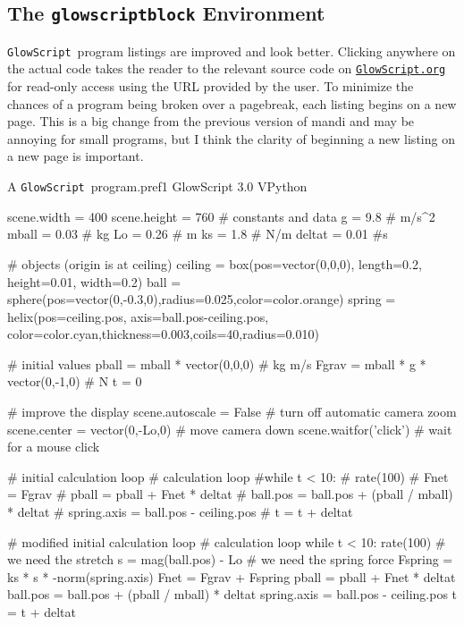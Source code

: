 \documentclass{article}
\newcommand*{\pkg}[1]{\textsf{#1}}                    %
\newcommand*{\GlowScript}{\texttt{GlowScript}}        %
\newcommand*{\GlowScriptorg}{\texttt{GlowScript.org}} %
\begin{document}
\subsection{The \texttt{glowscriptblock} Environment}
\GlowScript\ program listings are improved and look better. Clicking anywhere on the actual 
code takes the reader to the relevant source code on \href{https://www.glowscript.org}{\GlowScriptorg}
for read-only access using the URL provided by the user. To minimize the chances of a program being 
broken over a pagebreak, each listing begins on a new page. This is a big change from the previous 
version of \pkg{mandi} and may be annoying for small programs, but I think the clarity of beginning a
new listing on a new page is important.

\begin{glowscriptblock}{A \GlowScript\ program.}{pref1}
GlowScript 3.0 VPython

scene.width = 400
scene.height = 760
# constants and data
g = 9.8       # m/s^2
mball = 0.03  # kg
Lo = 0.26     # m
ks = 1.8      # N/m
deltat = 0.01 #s 

# objects (origin is at ceiling)
ceiling = box(pos=vector(0,0,0), length=0.2, height=0.01, width=0.2)
ball = sphere(pos=vector(0,-0.3,0),radius=0.025,color=color.orange)
spring = helix(pos=ceiling.pos, axis=ball.pos-ceiling.pos,
         color=color.cyan,thickness=0.003,coils=40,radius=0.010)

# initial values
pball = mball * vector(0,0,0)      # kg m/s
Fgrav = mball * g * vector(0,-1,0) # N
t = 0

# improve the display
scene.autoscale = False        # turn off automatic camera zoom
scene.center = vector(0,-Lo,0) # move camera down
scene.waitfor('click')         # wait for a mouse click

# initial calculation loop
# calculation loop
#while t < 10:
#    rate(100)
#    Fnet = Fgrav
#    pball = pball + Fnet * deltat
#    ball.pos = ball.pos + (pball / mball) * deltat
#    spring.axis = ball.pos - ceiling.pos
#    t = t + deltat
    
# modified initial calculation loop
# calculation loop
while t < 10:
    rate(100)
    # we need the stretch
    s = mag(ball.pos) - Lo
    # we need the spring force
    Fspring = ks * s * -norm(spring.axis)
    Fnet = Fgrav + Fspring
    pball = pball + Fnet * deltat
    ball.pos = ball.pos + (pball / mball) * deltat
    spring.axis = ball.pos - ceiling.pos
    t = t + deltat
\end{glowscriptblock}
\end{document}
